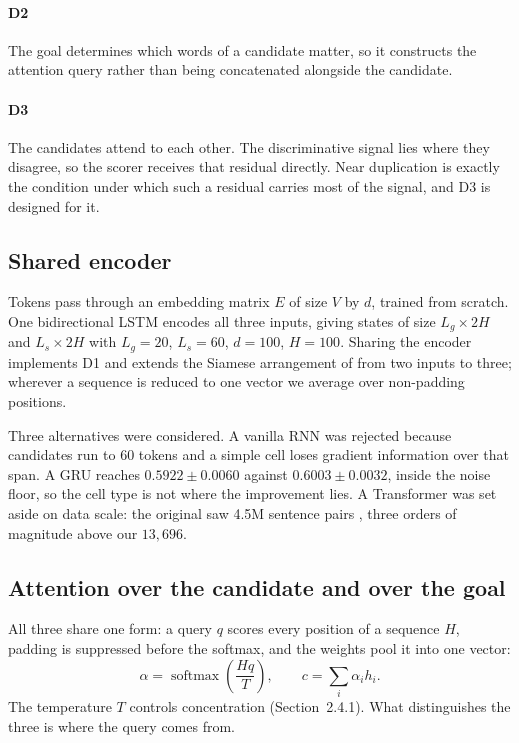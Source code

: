 \documentclass[11pt]{article}
\begin{document}
\paragraph{D2}
The goal determines which words of a candidate matter, so it constructs the
attention query rather than being concatenated alongside the candidate.

\paragraph{D3}
The candidates attend to each other. The discriminative signal lies where
they disagree, so the scorer receives that residual directly. Near
duplication is exactly the condition under which such a residual carries most
of the signal, and D3 is designed for it.

\subsection{Shared encoder}

Tokens pass through an embedding matrix $E$ of size $V$ by $d$, trained from
scratch. One bidirectional LSTM \citep{hochreiter1997lstm} encodes all three
inputs, giving states of size $L_g\times 2H$ and $L_s\times 2H$ with
$L_g=20$, $L_s=60$, $d=100$, $H=100$. Sharing the encoder implements D1 and
extends the Siamese arrangement of \citet{mueller2016siamese} from two inputs
to three; wherever a sequence is reduced to one vector we average over
non-padding positions.

Three alternatives were considered. A vanilla RNN was rejected because
candidates run to $60$ tokens and a simple cell loses gradient information
over that span. A GRU reaches $0.5922\pm0.0060$ against
$0.6003\pm0.0032$, inside the noise floor, so the cell type is not where the
improvement lies. A Transformer was set aside on data scale: the original saw
4.5M sentence pairs \citep{vaswani2017attention}, three orders of magnitude
above our $13{,}696$.

\subsection{Attention over the candidate and over the goal}

All three share one form: a query $q$ scores every position of a sequence
$H$, padding is suppressed before the softmax, and the weights pool it into
one vector:
\begin{equation}
\alpha=\operatorname{softmax}\!\left(\frac{Hq}{T}\right),\qquad
c=\sum_i\alpha_i h_i.
\label{eq:attention}
\end{equation}
The temperature $T$ controls concentration (Section~2.4.1). What distinguishes
the three is where the query comes from.
\end{document}
